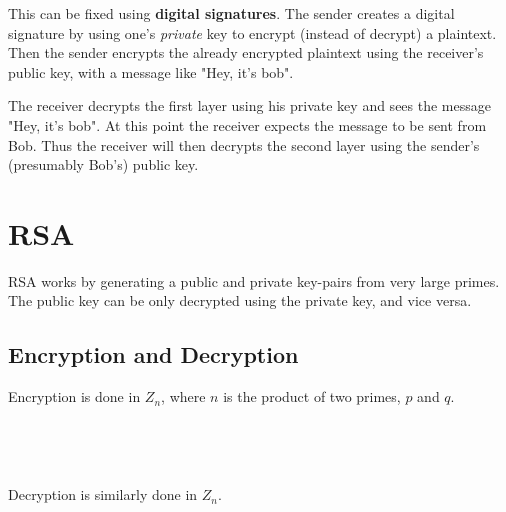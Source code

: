 \documentclass{article}
\begin{document}
	This can be fixed using \textbf{digital signatures}. The sender creates a digital signature by using one's \textit{private} key to encrypt (instead of decrypt) a plaintext. Then the sender encrypts the already encrypted plaintext using the receiver's public key, with a message like "Hey, it's bob". 
	
	The receiver decrypts the first layer using his private key and sees the message "Hey, it's bob". At this point the receiver expects the message to be sent from Bob. Thus the receiver will then decrypts the second layer using the sender's (presumably Bob's) public key. 
	
	\section*{RSA} 
	RSA works by generating a public and private key-pairs from very large primes. The public key can be only decrypted using the private key, and vice versa. \cite{rsa-sum}
	
	\subsection*{Encryption and Decryption \cite{rsa-crypt}}
	Encryption is done in $Z_n$, where $n$ is the product of two primes, $p$ and $q$.
	\\
	\\
	\\
	\\
	\\
	Decryption is similarly done in $Z_n$.
	\\
	\\
	
\end{document}
